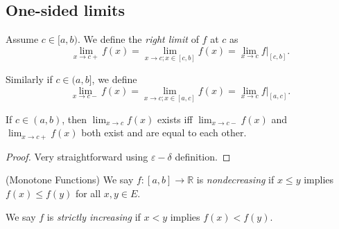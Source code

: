 
\subsection{One-sided limits}

Assume $c \in [a,b)$.
We define the \textit{right limit} of $f$ at $c$ as
\[
	\lim_{x \to c+} f(x) = \lim_{x \to c; x \in [c,b]} f(x) = \lim_{x \to c} f|_{[c,b]}
.\] 

Similarly if $c \in (a,b]$, we define
\[
	\lim_{x \to c-} f(x) = \lim_{x \to c; x \in [a,c]} f(x) = \lim_{x \to c} f|_{[a,c]}
.\] 

\begin{proposition}
	If $c \in (a,b)$, then $\lim_{x \to c} f(x)$ exists iff $\lim_{x \to c-} f(x)$ and $\lim_{x \to c+} f(x)$ both exist and are equal to each other.
\end{proposition}
\begin{proof}
	Very straightforward using $\varepsilon-\delta$ definition.
\end{proof}

\begin{example}
	(Monotone Functions)
	We say $f: [a,b] \to \mathbb{R}$ is \textit{nondecreasing} if $x\le y$ implies $f(x) \le f(y)$ for all  $x,y \in E$.

	We say $f$ is \textit{strictly increasing} if $x<y$ implies $f(x) <f(y)$.
\end{example}

